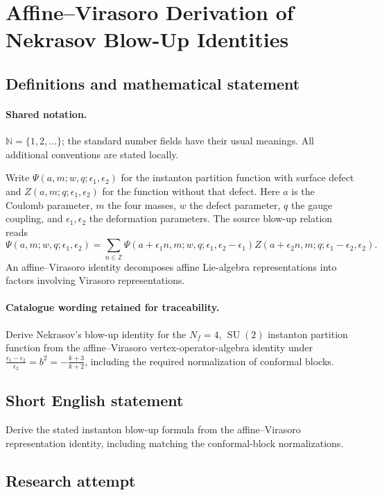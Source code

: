 \documentclass[11pt]{article}
\begin{document}
\section{Affine–Virasoro Derivation of Nekrasov Blow-Up Identities}\label{statement}

\subsection{Definitions and mathematical statement}

\paragraph{Shared notation.}$\mathbb N=\{1,2,\ldots\}$; the standard number fields have their usual meanings. All additional conventions are stated locally.


Write $\Psi(a,m;w,q;\epsilon_1,\epsilon_2)$ for the instanton partition function with surface defect and $Z(a,m;q;\epsilon_1,\epsilon_2)$ for the function without that defect. Here $a$ is the Coulomb parameter, $m$ the four masses, $w$ the defect parameter, $q$ the gauge coupling, and $\epsilon_1,\epsilon_2$ the deformation parameters. The source blow-up relation reads
\[
\Psi(a,m;w,q;\epsilon_1,\epsilon_2)=\sum_{n\in\mathbb Z}
\Psi(a+\epsilon_1n,m;w,q;\epsilon_1,\epsilon_2-\epsilon_1)
Z(a+\epsilon_2n,m;q;\epsilon_1-\epsilon_2,\epsilon_2).
\]
An affine--Virasoro identity decomposes affine Lie-algebra representations into factors involving Virasoro representations.

\paragraph{Catalogue wording retained for traceability.}
Derive Nekrasov's blow-up identity for the $N_f=4$, $\operatorname{SU}(2)$ instanton partition function from the affine–Virasoro vertex-operator-algebra identity under $\frac{\epsilon_1-\epsilon_2}{\epsilon_2}=b^2=-\frac{k+3}{k+2}$, including the required normalization of conformal blocks.
\subsection{Short English statement}
Derive the stated instanton blow-up formula from the affine--Virasoro representation identity, including matching the conformal-block normalizations.
\subsection{Research attempt}
\end{document}
